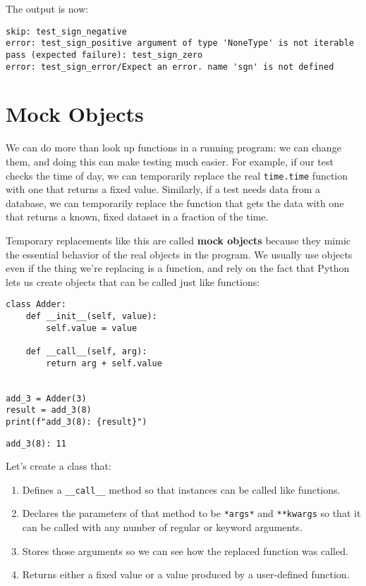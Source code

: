 \documentclass{scrbook}
\newcommand{\glossref}[1]{\textbf{#1}}
\begin{document}
The output is now:


\begin{lstlisting}[frame=single,frameround=tttt]
skip: test_sign_negative
error: test_sign_positive argument of type 'NoneType' is not iterable
pass (expected failure): test_sign_zero
error: test_sign_error/Expect an error. name 'sgn' is not defined
\end{lstlisting}


\section*{Mock Objects}


We can do more than look up functions in a running program:
we can change them,
and doing this can make testing much easier.
For example,
if our test checks the time of day,
we can temporarily replace the real \texttt{time.time} function
with one that returns a fixed value.
Similarly,
if a test needs data from a database,
we can temporarily replace the function that gets the data
with one that returns a known, fixed dataset in a fraction of the time.


Temporary replacements like this are called \glossref{mock objects}
because they mimic the essential behavior of the real objects in the program.
We usually use objects even if the thing we're replacing is a function,
and rely on the fact that Python lets us create objects that can be called just like functions:


\begin{lstlisting}[frame=single,frameround=tttt]
class Adder:
    def __init__(self, value):
        self.value = value

    def __call__(self, arg):
        return arg + self.value


add_3 = Adder(3)
result = add_3(8)
print(f"add_3(8): {result}")
\end{lstlisting}



\begin{lstlisting}[frame=single,frameround=tttt]
add_3(8): 11
\end{lstlisting}



Let's create a class that:

\begin{enumerate}

\item Defines a \texttt{\_\_call\_\_} method so that instances can be called like functions.

\item Declares the parameters of that method to be \texttt{*args*} and \texttt{**kwargs}
    so that it can be called with any number of regular or keyword arguments.

\item Stores those arguments so we can see how the replaced function was called.

\item Returns either a fixed value or a value produced by a user-defined function.

\end{enumerate}
\end{document}
